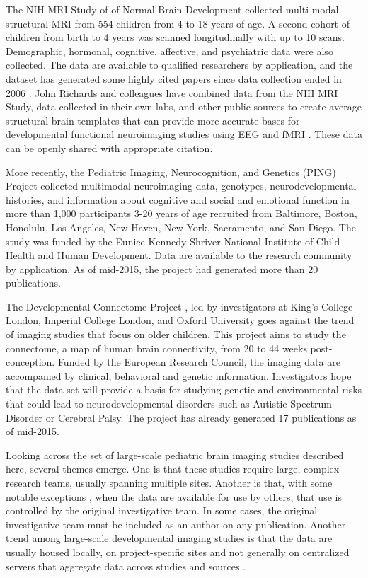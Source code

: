 \documentclass[letterpaper,man,apacite]{apa6}
\begin{document}
The NIH MRI Study of of Normal Brain Development \cite{NIH_Pediatric_MRI} collected multi-modal structural MRI from 554 children from 4 to 18 years of age.
A second cohort of children from birth to 4 years was scanned longitudinally with up to 10 scans. 
Demographic, hormonal, cognitive, affective, and psychiatric data were also collected.
The data are available to qualified researchers by application, and the dataset has generated some highly cited papers since data collection ended in 2006 \cite{group_total_2012, zielinski_network-level_2010}.
John Richards and colleagues have combined data from the NIH MRI Study, data collected in their own labs, and other public sources to create average structural brain templates that can provide more accurate bases for developmental functional neuroimaging studies using EEG and fMRI \cite{Richards_Developmental_MRI_Database, richards_database_2015}.
These data can be openly shared with appropriate citation.

More recently, the Pediatric Imaging, Neurocognition, and Genetics (PING) Project \cite{PING} collected multimodal neuroimaging data, genotypes, neurodevelopmental histories, and information about cognitive and social and emotional function in more than 1,000 participants 3-20 years of age recruited from Baltimore, Boston, Honolulu, Los Angeles, New Haven, New York, Sacramento, and San Diego. 
The study was funded by the Eunice Kennedy Shriver National Institute of Child Health and Human Development.
Data are available to the research community by application.
As of mid-2015, the project had generated more than 20 publications.

The Developmental Connectome Project \cite{developmental_connectome}, led by investigators at King’s College London, Imperial College London, and Oxford University goes against the trend of imaging studies that focus on older children.
This project aims to study the connectome, a map of human brain connectivity, from 20 to 44 weeks post-conception.
Funded by the European Research Council, the imaging data are accompanied by clinical, behavioral and genetic information.
Investigators hope that the data set will provide a basis for studying genetic and environmental risks that could lead to neurodevelopmental disorders such as Autistic Spectrum Disorder or Cerebral Palsy.
The project has already generated 17 publications as of mid-2015.

Looking across the set of large-scale pediatric brain imaging studies described here, several themes emerge.
One is that these studies require large, complex research teams, usually spanning multiple sites.
Another is that, with some notable exceptions \cite{richards_database_2015}, when the data are available for use by others, that use is controlled by the original investigative team.
In some cases, the original investigative team must be included as an author on any publication.
Another trend among large-scale developmental imaging studies is that the data are usually housed locally, on project-specific sites and not generally on centralized servers that aggregate data across studies and sources \cite{openfmri.org, neurovault.org}.
\end{document}
